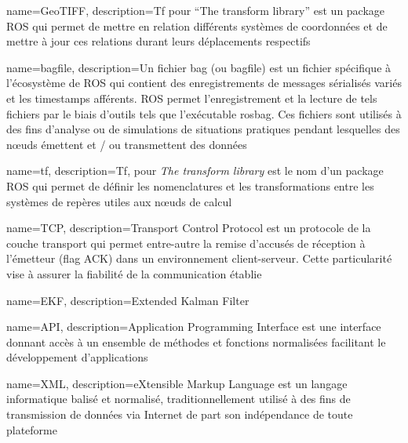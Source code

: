 {
  name={GeoTIFF},
    description={Tf pour ``The transform library'' est un package ROS qui permet de mettre en relation différents systèmes de coordonnées et de mettre à jour ces relations durant leurs déplacements respectifs}
}

{
  name={bagfile},
    description={Un fichier bag (ou bagfile) est un fichier spécifique à l'écosystème de ROS qui contient des enregistrements de messages sérialisés variés et les timestamps afférents. 
    ROS permet l'enregistrement et la lecture de tels fichiers par le biais d'outils tels que l'exécutable rosbag.
    Ces fichiers sont utilisés à des fins d'analyse ou de simulations de situations pratiques pendant lesquelles des n\oe{}uds émettent et / ou transmettent des données}
}

{
  name={tf},
    description={Tf, pour \emph{The transform library} est le nom d'un package ROS qui permet de définir les nomenclatures et les transformations entre les systèmes de repères utiles aux n\oe{}uds de calcul}
}

{
  name={TCP},
    description={Transport Control Protocol est un protocole de la couche transport qui permet entre-autre la remise d'accusés de réception à l'émetteur (flag ACK) dans un environnement client-serveur. 
    Cette particularité vise à assurer la fiabilité de la communication établie}
}

{
  name={EKF},
    description={Extended Kalman Filter}
}

{
  name={API},
    description={Application Programming Interface est une interface donnant accès à un ensemble de méthodes et fonctions normalisées facilitant le développement d'applications}
}

{
  name={XML},
    description={eXtensible Markup Language est un langage informatique balisé et normalisé, traditionnellement utilisé à des fins de transmission de données via Internet de part son indépendance de toute plateforme}
}